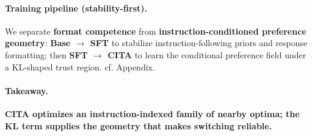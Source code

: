\vspace{-0.25em}
\begin{table}[t]
\centering
\footnotesize
\setlength{\tabcolsep}{6pt}
\renewcommand{\arraystretch}{1.06}
\vspace{-0.35em}
\caption{\textbf{Optuna-selected hyperparameters.} T5/T7 denote the best-performing trial IDs for each setting.}
\label{tab:hyperparams}
\vspace{-1.5em}
\end{table}


\vspace{-0.35em}
\paragraph{Training pipeline (stability-first).}
We separate \textbf{format competence} from \textbf{instruction-conditioned preference geometry}:
\textbf{Base $\rightarrow$ SFT} to stabilize instruction-following priors and response formatting; then \textbf{SFT $\rightarrow$ CITA} to learn the conditional preference field under a KL-shaped trust region. cf. Appendix. 

\vspace{-0.35em}
\paragraph{Takeaway.}
\textbf{CITA optimizes an instruction-indexed family of nearby optima; the KL term supplies the geometry that makes switching reliable.}















